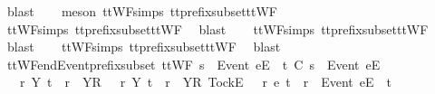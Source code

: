 \ blast\isanewline
\ \ \isamarkupfalse%
\ {\isacharparenleft}meson\ ttWF{\isachardot}simps{\isacharparenleft}{}{}{\isacharparenright}\ tt{\isacharunderscore}prefix{\isacharunderscore}subset{\isacharunderscore}ttWF{\isacharparenright}\isanewline
\ \ \isamarkupfalse%
\ ttWF{\isachardot}simps{\isacharparenleft}{}{}{\isacharparenright}\ tt{\isacharunderscore}prefix{\isacharunderscore}subset{\isacharunderscore}ttWF\ \isamarkupfalse%
\ blast\isanewline
\ \ \isamarkupfalse%
\ ttWF{\isachardot}simps{\isacharparenleft}{}{\isacharparenright}\ tt{\isacharunderscore}prefix{\isacharunderscore}subset{\isacharunderscore}ttWF\ \isamarkupfalse%
\ blast\isanewline
\ \ \isamarkupfalse%
\ ttWF{\isachardot}simps{\isacharparenleft}{}{\isacharparenright}\ tt{\isacharunderscore}prefix{\isacharunderscore}subset{\isacharunderscore}ttWF\ \isamarkupfalse%
\ blast%
\endisatagproof
{\isafoldproof}%
%
\isadelimproof
\isanewline
%
\endisadelimproof
\isanewline
{}\isamarkupfalse%
\ ttWF{\isacharunderscore}end{\isacharunderscore}Event{\isacharunderscore}prefix{\isacharunderscore}subset{\isacharcolon}\ {\isachardoublequoteopen}ttWF\ {\isacharparenleft}s\ {\isacharat}\ {\isacharbrackleft}{\isacharbrackleft}Event\ e{\isacharbrackright}\isactrlsub E{\isacharbrackright}{\isacharparenright}\ {\isasymLongrightarrow}\ t\ {\isasymlesssim}\isactrlsub C\ s\ {\isacharat}\ {\isacharbrackleft}{\isacharbrackleft}Event\ e{\isacharbrackright}\isactrlsub E{\isacharbrackright}\ {\isasymLongrightarrow}\ \isanewline
\ \ {\isacharparenleft}{\isasymexists}\ r\ Y{\isachardot}\ t\ {\isacharequal}\ r\ {\isacharat}\ {\isacharbrackleft}{\isacharbrackleft}Y{\isacharbrackright}\isactrlsub R{\isacharbrackright}{\isacharparenright}\ {\isasymor}\ {\isacharparenleft}{\isasymexists}\ r\ Y{\isachardot}\ t\ {\isacharequal}\ r\ {\isacharat}\ {\isacharbrackleft}{\isacharbrackleft}Y{\isacharbrackright}\isactrlsub R{\isacharcomma}\ {\isacharbrackleft}Tock{\isacharbrackright}\isactrlsub E{\isacharbrackright}{\isacharparenright}\ {\isasymor}\ {\isacharparenleft}{\isasymexists}\ r\ e{\isachardot}\ t\ {\isacharequal}\ r\ {\isacharat}\ {\isacharbrackleft}{\isacharbrackleft}Event\ e{\isacharbrackright}\isactrlsub E{\isacharbrackright}{\isacharparenright}\ {\isasymor}\ t\ {\isacharequal}\ {\isacharbrackleft}{\isacharbrackright}{\isachardoublequoteclose}\isanewline
%
\isadelimproof
\ \ %
\endisadelimproof
%
\isatagproof
{}\isamarkupfalse%

